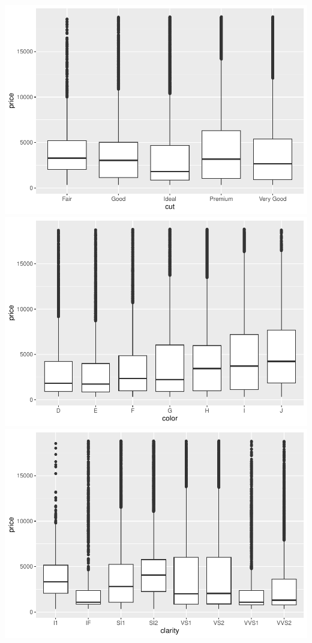 \documentclass[
]{book}
\begin{document}
\includegraphics{_main_files/figure-latex/unnamed-chunk-108-1.pdf} \includegraphics{_main_files/figure-latex/unnamed-chunk-108-2.pdf} \includegraphics{_main_files/figure-latex/unnamed-chunk-108-3.pdf}
\end{document}
